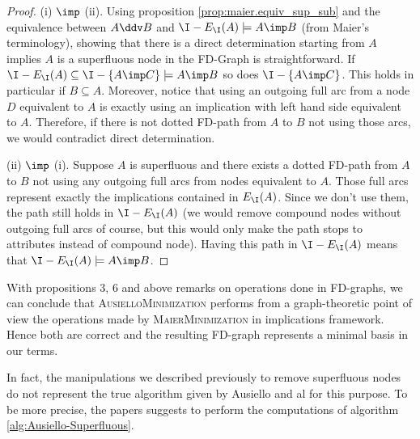 \begin{proof} (i) $\imp$ (ii). Using proposition
\ref{prop:maier.equiv_sup_sub} and the equivalence between $A \ddv B$
and $\I - E_{\I}(A) \models A \imp B$ (from Maier's terminology), showing that there is a direct determination starting from $A$ implies $A$ is a superfluous node in the FD-Graph is straightforward. If $\I - E_{\I}(A) \subseteq \I - \{A \imp C \} \models A \imp B$ so does $\I - \{A \imp C \}$. This holds in particular if $B \subseteq A$. Moreover, notice that using an outgoing full arc from a node $D$ equivalent to $A$ is exactly using an implication with left hand side equivalent to $A$. Therefore, if there is not dotted FD-path from $A$ to $B$ not using those arcs, we would contradict direct determination.

\vspace{1.2em}

(ii) $\imp$ (i). Suppose $A$ is superfluous and there exists a dotted FD-path from $A$ to $B$ not using any outgoing full arcs from nodes equivalent to $A$. Those full arcs represent exactly the implications contained in $E_{\I}(A)$. Since we don't use them, the path still holds in $\I - E_{\I}(A)$ (we would remove compound nodes without outgoing full arcs of course, but this would only make the path stops to attributes instead of compound node). Having this path in $\I - E_{\I}(A)$ means that $\I - E_{\I}(A) \models A \imp B$.
	
\end{proof}

With propositions 3, 6 and above remarks on operations done in FD-graphs, we
can conclude that \textsc{AusielloMinimization} performs from a graph-theoretic point of view the operations made by \textsc{MaierMinimization} in implications
framework. Hence both are correct and the resulting FD-graph represents a minimal basis in our terms. 

\vspace{1.2em}

In fact, the manipulations we described previously to remove superfluous nodes do not represent the true algorithm given by Ausiello and al for this purpose.
To be more precise, the papers \cite{ausiello_graph_1983, ausiello_minimal_1986} suggests to perform the computations of algorithm \ref{alg:Ausiello-Superfluous}.

\vspace{1.2em}

